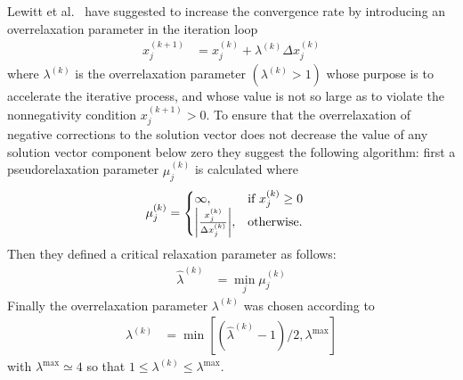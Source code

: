  Lewitt et al.\ \cite{Lewitt1986} have suggested to increase the convergence rate by introducing an overrelaxation parameter in the iteration loop
\begin{align}\label{eq:OverRelaxation}
  x_j^{(k+1)} &= x_j^{(k)} + \lambda^{(k)}\Delta x_j^{(k)}
\end{align}
where $\lambda^{(k)}$ is the overrelaxation parameter $(\lambda^{(k)}> 1)$ whose
purpose is to accelerate the iterative process, and whose value is not so large as to violate the nonnegativity condition $x_j^{(k+1)} > 0$. To ensure that the overrelaxation of negative corrections to the solution vector does not decrease the value of any solution vector component below zero they suggest the following algorithm: first a pseudorelaxation parameter $\mu_j^{(k)}$ is calculated where
\begin{align}
\label{eq:pseudorelaxation}
  \mu_j^{(k)} &=
  \begin{cases}
    \infty, & \mbox{if } x_j^{(k)} \geq 0 \\
    \abs{\frac{x_j^{(k)}}{\Delta x_j^{(k)}}}, & \mbox{otherwise}.
  \end{cases}
\end{align}
Then they defined a critical relaxation parameter as follows:
\begin{align}\label{eq:criticalrelaxationparameter}
  \hat{\lambda}^{(k)} &= \min_j \mu_j^{(k)}
\end{align}
Finally the overrelaxation parameter $\lambda^{(k)}$ was chosen according to
\begin{align}\label{eq:useopverrelaxationparameter}
  \lambda^{(k)} &= \min \left[ \left(\hat{\lambda}^{(k)}-1\right)/2,\lambda^{\max}\right]
\end{align}
with $\lambda^{\max} \simeq 4$ so that $1\leq  \lambda^{(k)}\leq \lambda^{\max}$.

